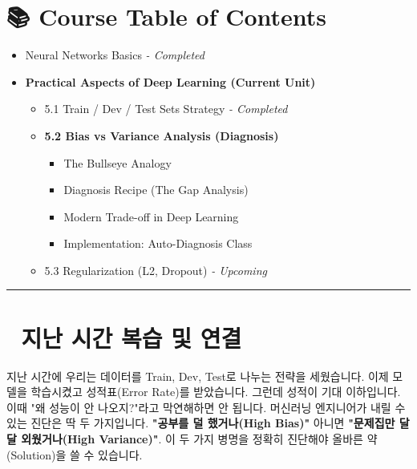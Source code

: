 \documentclass[11pt,a4paper]{book}
\theoremstyle{definition}
\begin{document}
\section*{📚 Course Table of Contents}
\begin{itemize}
    \item[Chapter 1-4.] Neural Networks Basics \textit{- Completed}
    \item[\textbf{Chapter 5.}] \textbf{Practical Aspects of Deep Learning (Current Unit)}
    \begin{itemize}
        \item 5.1 Train / Dev / Test Sets Strategy \textit{- Completed}
        \item \textbf{5.2 Bias vs Variance Analysis (Diagnosis)}
        \begin{itemize}
            \item The Bullseye Analogy
            \item Diagnosis Recipe (The Gap Analysis)
            \item Modern Trade-off in Deep Learning
            \item Implementation: Auto-Diagnosis Class
        \end{itemize}
        \item 5.3 Regularization (L2, Dropout) \textit{- Upcoming}
    \end{itemize}
\end{itemize}

\vspace{0.5cm}
\hrule
\vspace{0.5cm}

\section*{🔗 지난 시간 복습 및 연결}
지난 시간에 우리는 데이터를 Train, Dev, Test로 나누는 전략을 세웠습니다. 이제 모델을 학습시켰고 성적표(Error Rate)를 받았습니다. 그런데 성적이 기대 이하입니다.
이때 "왜 성능이 안 나오지?"라고 막연해하면 안 됩니다. 머신러닝 엔지니어가 내릴 수 있는 진단은 딱 두 가지입니다. \textbf{"공부를 덜 했거나(High Bias)"} 아니면 \textbf{"문제집만 달달 외웠거나(High Variance)"}. 이 두 가지 병명을 정확히 진단해야 올바른 약(Solution)을 쓸 수 있습니다.

\end{document}
